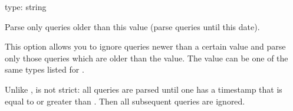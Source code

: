 \documentclass[letterpaper,10pt,english]{sphinxmanual}
\begin{document}

\begin{fulllineitems}
\label{\detokenize{mariadb-query-digest:cmdoption-mariadb-query-digest-until}}
type: string

Parse only queries older than this value (parse queries until this date).

This option allows you to ignore queries newer than a certain value and parse
only those queries which are older than the value.  The value can be one of
the same types listed for {\hyperref[\detokenize{mariadb-query-digest:cmdoption-mariadb-query-digest-since}]{}}.

Unlike {\hyperref[\detokenize{mariadb-query-digest:cmdoption-mariadb-query-digest-since}]{}}, {\hyperref[\detokenize{mariadb-query-digest:cmdoption-mariadb-query-digest-until}]{}} is not strict: all queries are parsed until
one has a timestamp that is equal to or greater than {\hyperref[\detokenize{mariadb-query-digest:cmdoption-mariadb-query-digest-until}]{}}.  Then
all subsequent queries are ignored.

\end{fulllineitems}

\end{document}
